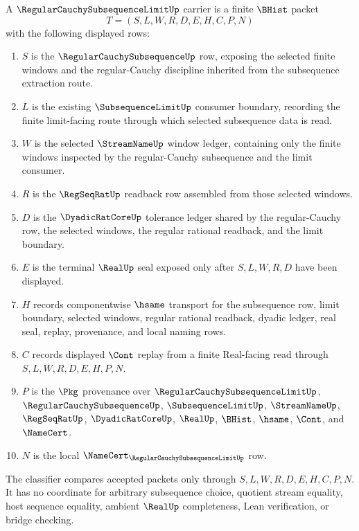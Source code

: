 \begin{definition}
\label{def:regular-cauchy-subsequence-limit-carrier}
A $\RegularCauchySubsequenceLimitUp$ carrier is a finite $\BHist$ packet
$$
T=(S,L,W,R,D,E,H,C,P,N)
$$
with the following displayed rows:
\begin{enumerate}
\item $S$ is the $\RegularCauchySubsequenceUp$ row, exposing the selected finite windows and the regular-Cauchy discipline inherited from the subsequence extraction route.
\item $L$ is the existing $\SubsequenceLimitUp$ consumer boundary, recording the finite limit-facing route through which selected subsequence data is read.
\item $W$ is the selected $\StreamNameUp$ window ledger, containing only the finite windows inspected by the regular-Cauchy subsequence and the limit consumer.
\item $R$ is the $\RegSeqRatUp$ readback row assembled from those selected windows.
\item $D$ is the $\DyadicRatCoreUp$ tolerance ledger shared by the regular-Cauchy row, the selected windows, the regular rational readback, and the limit boundary.
\item $E$ is the terminal $\RealUp$ seal exposed only after $S,L,W,R,D$ have been displayed.
\item $H$ records componentwise $\hsame$ transport for the subsequence row, limit boundary, selected windows, regular rational readback, dyadic ledger, real seal, replay, provenance, and local naming rows.
\item $C$ records displayed $\Cont$ replay from a finite Real-facing read through $S,L,W,R,D,E,H,P,N$.
\item $P$ is the $\Pkg$ provenance over $\RegularCauchySubsequenceLimitUp$, $\RegularCauchySubsequenceUp$, $\SubsequenceLimitUp$, $\StreamNameUp$, $\RegSeqRatUp$, $\DyadicRatCoreUp$, $\RealUp$, $\BHist$, $\hsame$, $\Cont$, and $\NameCert$.
\item $N$ is the local $\NameCert_{\RegularCauchySubsequenceLimitUp}$ row.
\end{enumerate}
The classifier compares accepted packets only through $S,L,W,R,D,E,H,C,P,N$. It has no coordinate for arbitrary subsequence choice, quotient stream equality, host sequence equality, ambient $\RealUp$ completeness, Lean verification, or bridge checking.
\end{definition}

